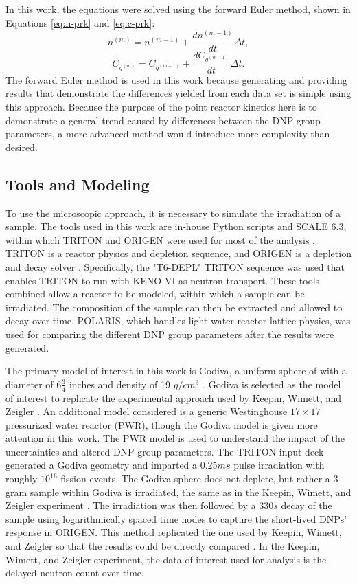 \documentclass{style/nseJournal}
\begin{document}
In this work, the equations were solved using the forward Euler method, shown in Equations \eqref{eq:n-prk} and \eqref{eq:c-prk}:
\begin{equation}
n^{(m)} = n^{(m-1)} + \frac{dn^{(m-1)}}{dt} \Delta t
\label{eq:n-prk},
\end{equation}
\begin{equation}
C_{g^{(m)}} = C_{g^{(m-1)}} + \frac{dC_{g^{(m-1)}}}{dt} \Delta t
\label{eq:c-prk}.
\end{equation}
The forward Euler method is used in this work because generating and providing results that demonstrate the differences yielded from each data set is simple using this approach.
Because the purpose of the point reactor kinetics here is to demonstrate a general trend caused by differences between the DNP group parameters, a more advanced method would introduce more complexity than desired.

\subsection{Tools and Modeling}
\label{sec:tools}

To use the microscopic approach, it is necessary to simulate the irradiation of a sample.
The tools used in this work are in-house Python scripts and SCALE 6.3, within which TRITON and ORIGEN were used for most of the analysis \cite{scripts}. TRITON is a reactor physics and depletion sequence, and ORIGEN is a depletion and decay solver \cite{wieselquist_scale_2023}. Specifically, the "T6-DEPL" TRITON sequence was used that enables TRITON to run with KENO-VI as neutron transport. These tools combined allow a reactor to be modeled, within which a sample can be irradiated. The composition of the sample can then be extracted and allowed to decay over time.
POLARIS, which handles light water reactor lattice physics, was used for comparing the different DNP group parameters after the results were generated.

The primary model of interest in this work is Godiva, a uniform sphere of  with a diameter of $6 \frac{3}{4}$ inches and density of 19 $g/cm^3$ \cite{Peterson1956ANUU}.
Godiva is selected as the model of interest to replicate the experimental approach used by Keepin, Wimett, and Zeigler \cite{KEEPIN1957IN2}.
An additional model considered is a generic Westinghouse $17\times17$ pressurized water reactor (PWR), though the Godiva model is given more attention in this work.
The PWR model is used to understand the impact of the uncertainties and altered DNP group parameters.
The TRITON input deck generated a Godiva geometry and imparted a 0.25$ms$ pulse irradiation with roughly $10^{16}$ fission events.
The Godiva sphere does not deplete, but rather a 3 gram sample within Godiva is irradiated, the same as in the Keepin, Wimett, and Zeigler experiment \cite{KEEPIN1957IN2}.
The irradiation was then followed by a 330$s$ decay of the sample using logarithmically spaced time nodes to capture the short-lived DNPs' response in ORIGEN. This method replicated the one used by Keepin, Wimett, and Zeigler so that the results could be directly compared \cite{KEEPIN1957IN2}. In the Keepin, Wimett, and Zeigler experiment, the data of interest used for analysis is the delayed neutron count over time.
\end{document}
